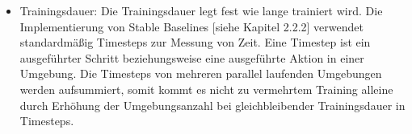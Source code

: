 \begin{itemize}
\item 
Trainingsdauer: Die Trainingsdauer legt fest wie lange trainiert wird. Die Implementierung von Stable Baselines [siehe Kapitel 2.2.2] verwendet standardmäßig Timesteps zur Messung von Zeit. Eine Timestep ist ein ausgeführter Schritt beziehungsweise eine ausgeführte Aktion in einer Umgebung. Die Timesteps von mehreren parallel laufenden Umgebungen werden aufsummiert, somit kommt es nicht zu vermehrtem Training alleine durch Erhöhung der Umgebungsanzahl bei gleichbleibender Trainingsdauer in Timesteps.
\end{itemize}